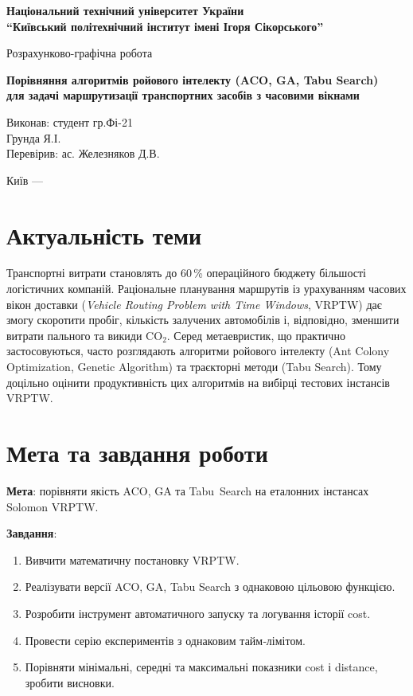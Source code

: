 \documentclass[12pt,a4paper]{article}
\begin{document}
\begin{titlepage}
    \centering
    {\large\bfseries Національний технічний університет України\\
    ``Київський політехнічний інститут імені Ігоря Сікорського'' \par}
    \vspace{2cm}
    {\Large Розрахунково-графічна робота\par}
    \vspace{1cm}
    {\LARGE\bfseries Порівняння алгоритмів ройового інтелекту (ACO, GA, Tabu Search)\\
    для задачі маршрутизації транспортних засобів з часовими вікнами\par}
    \vfill
    \begin{flushright}
    Виконав: студент гр.Фі-21\\
    Грунда Я.І.\\[0.5cm]
    Перевірив: ас. Железняков Д.В.
    \end{flushright}
    \vfill
    {\large Київ --- \the\year\par}
\end{titlepage}

\tableofcontents
\newpage

\section{Актуальність теми}
Транспортні витрати становлять до 60\,\% операційного бюджету більшості логістичних компаній. 
Раціональне планування маршрутів із урахуванням часових вікон доставки 
(\emph{Vehicle Routing Problem with Time Windows}, VRPTW) дає змогу 
скоротити пробіг, кількість залучених автомобілів і, відповідно, 
зменшити витрати пального та викиди \(\mathrm{CO_2}\). 
Серед метаевристик, що практично застосовуються, часто розглядають 
алгоритми ройового інтелекту (Ant Colony Optimization, Genetic Algorithm) 
та траєкторні методи (Tabu Search). 
Тому доцільно оцінити продуктивність цих алгоритмів на вибірці тестових інстансів VRPTW.

\section{Мета та завдання роботи}
\textbf{Мета}: порівняти якість ACO, GA та Tabu~Search на
еталонних інстансах Solomon VRPTW.

\textbf{Завдання}:
\begin{enumerate}
  \item Вивчити математичну постановку VRPTW.
  \item Реалізувати версії ACO, GA, Tabu Search з однаковою
        цільовою функцією.
  \item Розробити інструмент автоматичного запуску та логування історії cost.
  \item Провести серію експериментів з однаковим тайм‑лімітом.
  \item Порівняти мінімальні, середні та максимальні показники cost і distance,
        зробити висновки.
\end{enumerate}
\end{document}
